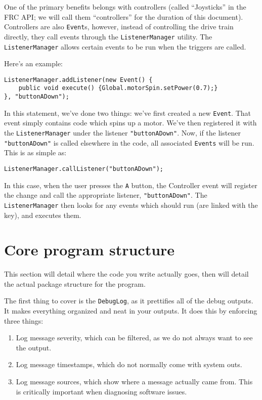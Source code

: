 \documentclass[a4paper]{article}
\begin{document}
One of the primary benefits belongs with controllers (called ``Joysticks'' in the FRC API; we will call them ``controllers'' for the duration of this document). Controllers are also \lstinline{Event}s, however, instead of controlling the drive train directly, they call events through the \lstinline{ListenerManager} utility. The \lstinline{ListenerManager} allows certain events to be run when the triggers are called. 

Here's an example:

\begin{lstlisting}
ListenerManager.addListener(new Event() {
	public void execute() {Global.motorSpin.setPower(0.7);}
}, "buttonADown");
\end{lstlisting}

In this statement, we've done two things: we've first created a new \lstinline{Event}. That event simply contains code which spins up a motor. We've then registered it with the \lstinline{ListenerManager} under the listener \lstinline{"buttonADown"}. Now, if the listener \lstinline{"buttonADown"} is called elsewhere in the code, all associated \lstinline{Events} will be run. This is as simple as:

\begin{lstlisting}
ListenerManager.callListener("buttonADown");
\end{lstlisting}

In this case, when the user presses the \lstinline{A} button, the Controller event will register the change and call the appropriate listener, \lstinline{"buttonADown"}. The \lstinline{ListenerManager} then looks for any events which should run (are linked with the key), and executes them.


\section{Core program structure}
This section will detail where the code you write actually goes, then will detail the actual package structure for the program.\newline

The first thing to cover is the \lstinline{DebugLog}, as it prettifies all of the debug outputs. It makes everything organized and neat in your outputs. It does this by enforcing three things:
\begin{enumerate}\item{Log message severity, which can be filtered, as we do not always want to see the output.}\item{Log message timestamps, which do not normally come with system outs.}\item{Log message sources, which show where a message actually came from. This is critically important when diagnosing software issues.}\end{enumerate}
\end{document}
